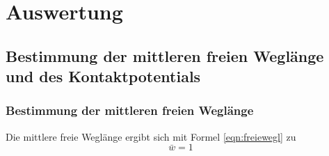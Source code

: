 \section{Auswertung}
\label{sec:Auswertung}
\FloatBarrier
\subsection{Bestimmung der mittleren freien Weglänge und des Kontaktpotentials}
\subsubsection{Bestimmung der mittleren freien Weglänge}
Die mittlere freie Weglänge ergibt sich mit Formel \eqref{eqn:freiewegl} zu
\begin{equation*}
	\bar{w} = 1
\end{equation*}

\FloatBarrier
